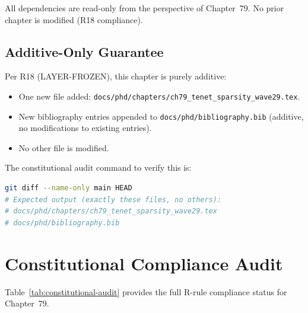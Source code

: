 All dependencies are read-only from the perspective of Chapter~79.
No prior chapter is modified (R18 compliance).

\subsection{Additive-Only Guarantee}
\label{subsec:ch79-additive}

Per R18 (LAYER-FROZEN), this chapter is purely additive:
\begin{itemize}
  \item One new file added:
        \texttt{docs/phd/chapters/ch79\_tenet\_sparsity\_wave29.tex}.
  \item New bibliography entries appended to
        \texttt{docs/phd/bibliography.bib} (additive, no modifications
        to existing entries).
  \item No other file is modified.
\end{itemize}

The constitutional audit command to verify this is:

\begin{lstlisting}[language=bash, caption={R18 additive-only audit command},
  label={lst:r18-audit}]
git diff --name-only main HEAD
# Expected output (exactly these files, no others):
# docs/phd/chapters/ch79_tenet_sparsity_wave29.tex
# docs/phd/bibliography.bib
\end{lstlisting}

\section{Constitutional Compliance Audit}
\label{sec:ch79-constitutional-audit}

Table~\ref{tab:constitutional-audit} provides the full R-rule compliance
status for Chapter~79.

